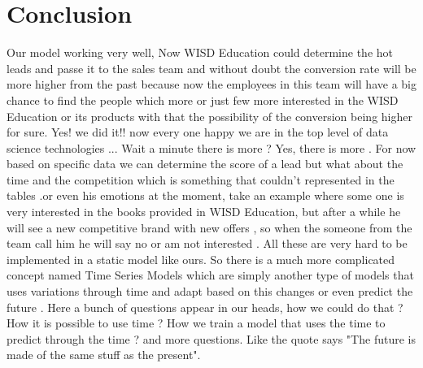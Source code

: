 \chapter*{Conclusion}
Our model working very well, Now WISD Education could determine the hot leads and passe it to the sales team and without doubt the conversion rate will be more higher from the past because now the employees in this team will have a big chance to find the people which more or just few more interested in the WISD Education or its products with that the possibility of the conversion being higher for sure. Yes! we did it!! now every one happy we are in the top level of data science technologies ... Wait a minute there is more ? Yes, there is more . For now based on specific data we can determine the score of a lead but what about the time and the competition which is something that couldn't represented in the tables .or even his emotions at the moment, take an example where some one is very interested in the books provided in WISD Education, but after a while he will see a new competitive brand with new offers , so when the someone from the team call him he will say no or am not interested . All these are very hard to be implemented in a static model like ours. So there is a much more complicated concept named Time Series Models which are simply another type of models that uses variations through time and adapt based on this changes or even predict the future . Here a bunch of questions appear in our heads, how we could do that ? How it is possible to use time ? How we train a model that uses the time to predict through the time ? and more questions. Like the quote says  "The future is made of the same stuff as the present".
\blindtext[2]
